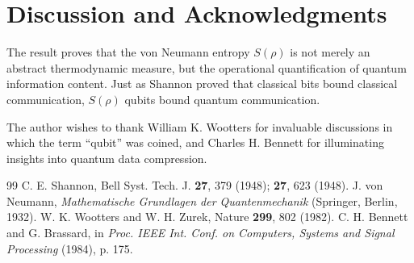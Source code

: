 \documentclass[twocolumn,10pt,letterpaper]{article}
\begin{document}
\section{Discussion and Acknowledgments}
The result proves that the von Neumann entropy $S(\rho)$ is not merely an abstract thermodynamic measure, but the operational quantification of quantum information content. Just as Shannon proved that classical bits bound classical communication, $S(\rho)$ qubits bound quantum communication.

The author wishes to thank William K. Wootters for invaluable discussions in which the term ``qubit'' was coined, and Charles H. Bennett for illuminating insights into quantum data compression.

\begin{thebibliography}{99}
 C. E. Shannon, Bell Syst. Tech. J. \textbf{27}, 379 (1948); \textbf{27}, 623 (1948).
 J. von Neumann, \textit{Mathematische Grundlagen der Quantenmechanik} (Springer, Berlin, 1932).
 W. K. Wootters and W. H. Zurek, Nature \textbf{299}, 802 (1982).
 C. H. Bennett and G. Brassard, in \textit{Proc. IEEE Int. Conf. on Computers, Systems and Signal Processing} (1984), p. 175.
\end{thebibliography}
\end{document}
